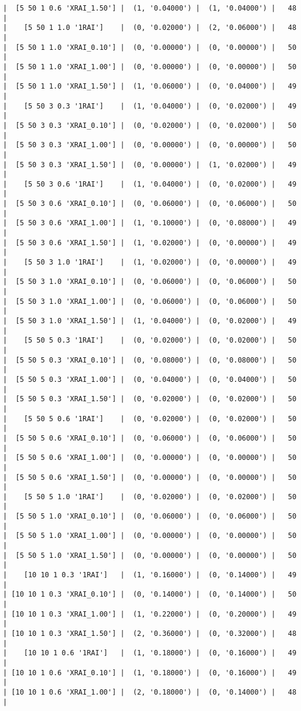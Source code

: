 \documentclass{article}
\begin{document}
\begin{verbatim}
|  [5 50 1 0.6 'XRAI_1.50'] |  (1, '0.04000') |  (1, '0.04000') |   48  |
|    [5 50 1 1.0 '1RAI']    |  (0, '0.02000') |  (2, '0.06000') |   48  |
|  [5 50 1 1.0 'XRAI_0.10'] |  (0, '0.00000') |  (0, '0.00000') |   50  |
|  [5 50 1 1.0 'XRAI_1.00'] |  (0, '0.00000') |  (0, '0.00000') |   50  |
|  [5 50 1 1.0 'XRAI_1.50'] |  (1, '0.06000') |  (0, '0.04000') |   49  |
|    [5 50 3 0.3 '1RAI']    |  (1, '0.04000') |  (0, '0.02000') |   49  |
|  [5 50 3 0.3 'XRAI_0.10'] |  (0, '0.02000') |  (0, '0.02000') |   50  |
|  [5 50 3 0.3 'XRAI_1.00'] |  (0, '0.00000') |  (0, '0.00000') |   50  |
|  [5 50 3 0.3 'XRAI_1.50'] |  (0, '0.00000') |  (1, '0.02000') |   49  |
|    [5 50 3 0.6 '1RAI']    |  (1, '0.04000') |  (0, '0.02000') |   49  |
|  [5 50 3 0.6 'XRAI_0.10'] |  (0, '0.06000') |  (0, '0.06000') |   50  |
|  [5 50 3 0.6 'XRAI_1.00'] |  (1, '0.10000') |  (0, '0.08000') |   49  |
|  [5 50 3 0.6 'XRAI_1.50'] |  (1, '0.02000') |  (0, '0.00000') |   49  |
|    [5 50 3 1.0 '1RAI']    |  (1, '0.02000') |  (0, '0.00000') |   49  |
|  [5 50 3 1.0 'XRAI_0.10'] |  (0, '0.06000') |  (0, '0.06000') |   50  |
|  [5 50 3 1.0 'XRAI_1.00'] |  (0, '0.06000') |  (0, '0.06000') |   50  |
|  [5 50 3 1.0 'XRAI_1.50'] |  (1, '0.04000') |  (0, '0.02000') |   49  |
|    [5 50 5 0.3 '1RAI']    |  (0, '0.02000') |  (0, '0.02000') |   50  |
|  [5 50 5 0.3 'XRAI_0.10'] |  (0, '0.08000') |  (0, '0.08000') |   50  |
|  [5 50 5 0.3 'XRAI_1.00'] |  (0, '0.04000') |  (0, '0.04000') |   50  |
|  [5 50 5 0.3 'XRAI_1.50'] |  (0, '0.02000') |  (0, '0.02000') |   50  |
|    [5 50 5 0.6 '1RAI']    |  (0, '0.02000') |  (0, '0.02000') |   50  |
|  [5 50 5 0.6 'XRAI_0.10'] |  (0, '0.06000') |  (0, '0.06000') |   50  |
|  [5 50 5 0.6 'XRAI_1.00'] |  (0, '0.00000') |  (0, '0.00000') |   50  |
|  [5 50 5 0.6 'XRAI_1.50'] |  (0, '0.00000') |  (0, '0.00000') |   50  |
|    [5 50 5 1.0 '1RAI']    |  (0, '0.02000') |  (0, '0.02000') |   50  |
|  [5 50 5 1.0 'XRAI_0.10'] |  (0, '0.06000') |  (0, '0.06000') |   50  |
|  [5 50 5 1.0 'XRAI_1.00'] |  (0, '0.00000') |  (0, '0.00000') |   50  |
|  [5 50 5 1.0 'XRAI_1.50'] |  (0, '0.00000') |  (0, '0.00000') |   50  |
|    [10 10 1 0.3 '1RAI']   |  (1, '0.16000') |  (0, '0.14000') |   49  |
| [10 10 1 0.3 'XRAI_0.10'] |  (0, '0.14000') |  (0, '0.14000') |   50  |
| [10 10 1 0.3 'XRAI_1.00'] |  (1, '0.22000') |  (0, '0.20000') |   49  |
| [10 10 1 0.3 'XRAI_1.50'] |  (2, '0.36000') |  (0, '0.32000') |   48  |
|    [10 10 1 0.6 '1RAI']   |  (1, '0.18000') |  (0, '0.16000') |   49  |
| [10 10 1 0.6 'XRAI_0.10'] |  (1, '0.18000') |  (0, '0.16000') |   49  |
| [10 10 1 0.6 'XRAI_1.00'] |  (2, '0.18000') |  (0, '0.14000') |   48  |

\end{verbatim}
\end{document}
